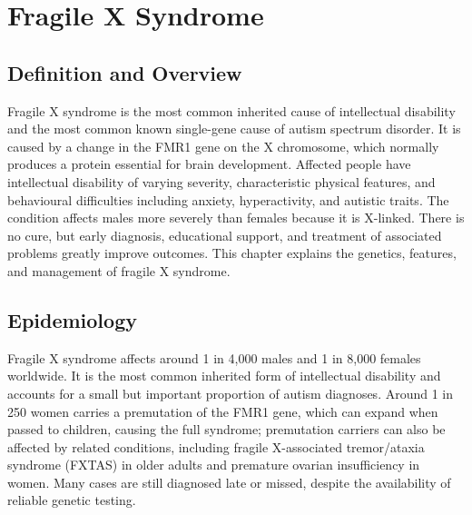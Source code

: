 \chapter{Fragile X Syndrome}

\section*{Definition and Overview}
Fragile X syndrome is the most common inherited cause of intellectual disability and the most common known single-gene cause of autism spectrum disorder. It is caused by a change in the FMR1 gene on the X chromosome, which normally produces a protein essential for brain development. Affected people have intellectual disability of varying severity, characteristic physical features, and behavioural difficulties including anxiety, hyperactivity, and autistic traits. The condition affects males more severely than females because it is X-linked. There is no cure, but early diagnosis, educational support, and treatment of associated problems greatly improve outcomes. This chapter explains the genetics, features, and management of fragile X syndrome.

\section*{Epidemiology}
Fragile X syndrome affects around 1 in 4,000 males and 1 in 8,000 females worldwide. It is the most common inherited form of intellectual disability and accounts for a small but important proportion of autism diagnoses. Around 1 in 250 women carries a premutation of the FMR1 gene, which can expand when passed to children, causing the full syndrome; premutation carriers can also be affected by related conditions, including fragile X-associated tremor/ataxia syndrome (FXTAS) in older adults and premature ovarian insufficiency in women. Many cases are still diagnosed late or missed, despite the availability of reliable genetic testing.

